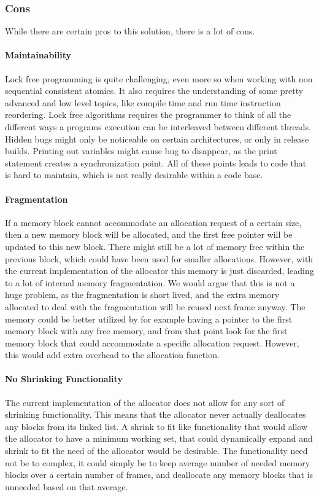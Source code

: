 \subsubsection{Cons}
While there are certain pros to this solution, there is a lot of cons.

\paragraph{Maintainability}
Lock free programming is quite challenging, even more so when working with non sequential consistent atomics.
It also requires the understanding of some pretty advanced and low level topics, like compile time and run time instruction reordering.
Lock free algorithms requires the programmer to think of all the different ways a programs execution can be interleaved between different threads.
Hidden bugs might only be noticeable on certain architectures, or only in release builds.
Printing out variables might cause bug to disappear, as the print statement creates a synchronization point.
All of these points leads to code that is hard to maintain, which is not really desirable within a code base.

\paragraph{Fragmentation}
If a memory block cannot accommodate an allocation request of a certain size, then a new memory block will be allocated,
and the first free pointer will be updated to this new block.
There might still be a lot of memory free within the previous block, which could have been used for smaller allocations.
However, with the current implementation of the allocator this memory is just discarded, leading to a lot of internal memory fragmentation.
We would argue that this is not a huge problem, as the fragmentation is short lived, and the extra memory allocated to deal with the fragmentation
will be reused next frame anyway.
The memory could be better utilized by for example having a pointer to the first memory block with any free memory, and from that point look for
the first memory block that could accommodate a specific allocation request. However, this would add extra overhead to the allocation function.

\paragraph{No Shrinking Functionality}
The current implementation of the allocator does not allow for any sort of shrinking functionality.
This means that the allocator never actually deallocates any blocks from its linked list.
A shrink to fit like functionality that would allow the allocator to have a minimum working set,
that could dynamically expand and shrink to fit the need of the allocator would be desirable.
The functionality need not be to complex, it could simply be to keep average number of needed memory blocks
over a certain number of frames, and deallocate any memory blocks that is unneeded based on that average.

